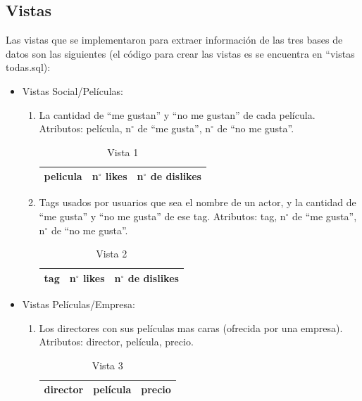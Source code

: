 \documentclass[12pt,letterpaper]{article}
\begin{document}
\subsection{Vistas}

Las vistas que se implementaron para extraer información de las tres bases de datos son las siguientes (el código para crear las vistas es se encuentra en ``vistas todas.sql):

\begin{itemize}
	\item Vistas Social/Películas:
	
	\begin{enumerate}
		\item La cantidad de ``me gustan'' y ``no me gustan'' de cada película. Atributos: película, n$^\circ$ de ``me gusta'', n$^\circ$ de ``no me gusta''.
		
		\begin{table}[ht!]
			\centering
			\begin{tabular}{||c|l|l||} \hline 
				pelicula & n$^\circ$ likes & n$^\circ$ de dislikes\\ \hline
			\end{tabular}
			\caption {Vista 1}  
		\end{table}


		\item  Tags usados por usuarios que sea el nombre de un actor, y la cantidad de ``me gusta'' y ``no me gusta'' de ese tag. Atributos: tag, n$^\circ$ de ``me gusta'', n$^\circ$ de ``no me gusta''.
		
		\begin{table}[ht!]
			\centering
			\begin{tabular}{||c|l|l||} \hline 
				tag & n$^\circ$ likes & n$^\circ$ de dislikes\\ \hline
			\end{tabular}
			\caption {Vista 2}  
		\end{table}
		
	\end{enumerate}
	
	\item Vistas Películas/Empresa:
	
	\begin{enumerate}
		\item Los directores con sus películas mas caras (ofrecida por una empresa). Atributos: director, película, precio. 
		
		\begin{table}[ht!]
			\centering
			\begin{tabular}{||c|l|l||} \hline 
				director & película & precio \\ \hline
			\end{tabular}
			\caption {Vista 3}  
		\end{table}
		

\end{enumerate}
\end{itemize}
\end{document}
